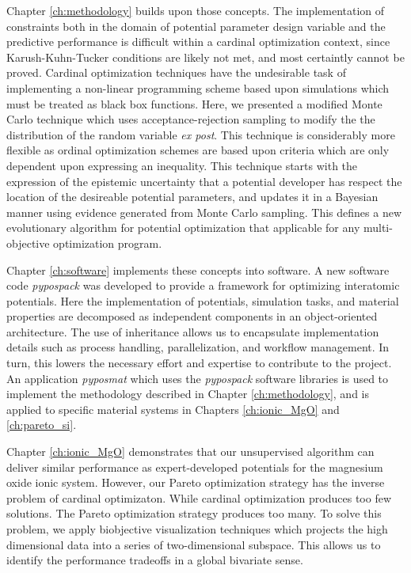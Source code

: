 Chapter \ref{ch:methodology} builds upon those concepts.  The implementation of constraints both in the domain of potential parameter design variable and the predictive performance is difficult within a cardinal optimization context, since Karush-Kuhn-Tucker conditions are likely not met, and most certaintly cannot be proved.  Cardinal optimization techniques have the undesirable task of implementing a non-linear programming scheme based upon simulations which must be treated as black box functions.  Here, we presented a modified Monte Carlo technique which uses acceptance-rejection sampling to modify the the distribution of the random variable \emph{ex post}.  This technique is considerably more flexible as ordinal optimization schemes are based upon criteria which are only dependent upon expressing an inequality.  This technique starts with the expression of the epistemic uncertainty that a potential developer has respect the location of the desireable potential parameters, and updates it in a Bayesian manner using evidence generated from Monte Carlo sampling.  This defines a new evolutionary algorithm for potential optimization that applicable for any multi-objective optimization program.

Chapter \ref{ch:software} implements these concepts into software.  A new software code \emph{pypospack} was developed to provide a framework for optimizing interatomic potentials.  Here the implementation of potentials, simulation tasks, and material properties are decomposed as independent components in an object-oriented architecture.  The use of inheritance allows us to encapsulate implementation details such as process handling, parallelization, and workflow management.  In turn, this lowers the necessary effort and expertise to contribute to the project.  An application \emph{pyposmat} which uses the \emph{pypospack} software libraries is used to implement the methodology described in Chapter \ref{ch:methodology}, and is applied to specific material systems in Chapters \ref{ch:ionic_MgO} and \ref{ch:pareto_si}.

Chapter \ref{ch:ionic_MgO} demonstrates that our unsupervised algorithm can deliver similar performance as expert-developed potentials for the magnesium oxide ionic system.  However, our Pareto optimization strategy has the inverse problem of cardinal optimizaton.  While cardinal optimization produces too few solutions.  The Pareto optimization strategy produces too many.  To solve this problem, we apply biobjective visualization techniques which projects the high dimensional data into a series of two-dimensional subspace.  This allows us to identify the performance tradeoffs in a global bivariate sense.

